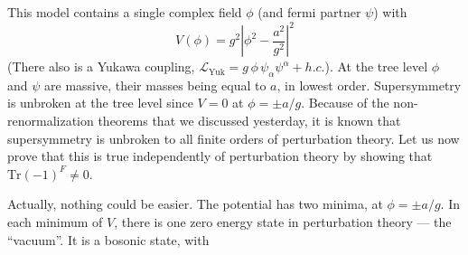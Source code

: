 This model contains a single complex field $\phi$ (and fermi
partner $\psi$) with
\begin{equation}
V(\phi) = g^2 \left|\phi^2 - \frac{a^2}{g^2}\right|^2
\tag{34}
\end{equation}
(There also is a Yukawa coupling, $\mathcal{L}_{\mathrm{Yuk}} = g\, \phi\, \psi_\alpha \psi^\alpha + h.c.$). At the
tree level $\phi$ and $\psi$ are massive, their masses being equal to $a$, in
lowest order. Supersymmetry is unbroken at the tree level since
$V = 0$ at $\phi = \pm a/g$. Because of the non-renormalization theorems that
we discussed yesterday, it is known that supersymmetry is unbroken
to all finite orders of perturbation theory. Let us now prove that
this is true independently of perturbation theory by showing that
$\mathrm{Tr}(-1)^F \neq 0$.

Actually, nothing could be easier. The potential has two minima,
at $\phi = \pm a/g$. In each minimum of $V$, there is one zero energy state in
perturbation theory --- the ``vacuum''. It is a bosonic state, with
